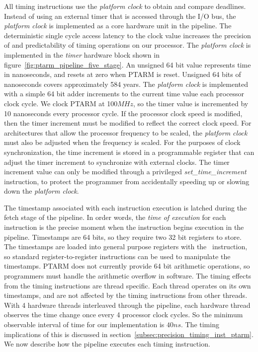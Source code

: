 All timing instructions use the \emph{platform clock} to obtain and compare deadlines.
Instead of using an external timer that is accessed through the I/O bus, the \emph{platform clock} is implemented as a core hardware unit in the pipeline.  
The deterministic single cycle access latency to the clock value increases the precision of and predictability of timing operations on our processor.  
The \emph{platform clock} is implemented in the \emph{timer} hardware block shown in figure~\ref{fig:ptarm_pipeline_five_stage}.   
An unsigned 64 bit value represents time in nanoseconds, and resets at zero when PTARM is reset.
Unsigned 64 bits of nanoseconds covers approximately 584 years. 
The \emph{platform clock} is implemented with a simple 64 bit adder increments to the current time value each processor clock cycle. 
We clock PTARM at 100$MHz$, so the timer value is incremented by 10 nanoseconds every processor cycle.
If the processor clock speed is modified, then the timer increment must be modified to reflect the correct clock speed. 
For architectures that allow the processor frequency to be scaled, the \emph{platform clock} must also be adjusted when the frequency is scaled.  
For the purposes of clock synchronization, the time increment is stored in a programmable register that can adjust the timer increment to synchronize with external clocks. 
The timer increment value can only be modified through a privileged \emph{set\_time\_increment} instruction, to protect the programmer from accidentally speeding up or slowing down the \emph{platform clock}.

The timestamp associated with each instruction execution is latched during the fetch stage of the pipeline.
In order words, the \emph{time of execution} for each instruction is the precise moment when the instruction begins execution in the pipeline.
Timestamps are 64 bits, so they require two 32 bit registers to store.
The timestamps are loaded into general purpose registers with the \gettime\ instruction, so standard register-to-register instructions can be used to manipulate the timestamps. 
PTARM does not currently provide 64 bit arithmetic operations, so programmers must handle the arithmetic overflow in software.
The timing effects from the timing instructions are thread specific.   
Each thread operates on its own timestamps, and are not affected by the timing instructions from other threads.
With 4 hardware threads interleaved through the pipeline, each hardware thread observes the time change once every 4 processor clock cycles.
So the minimum observable interval of time for our implementation is $40 ns$. 
The timing implications of this is discussed in section~\ref{subsec:precision_timing_inst_ptarm}.
We now describe how the pipeline executes each timing instruction.  
	
